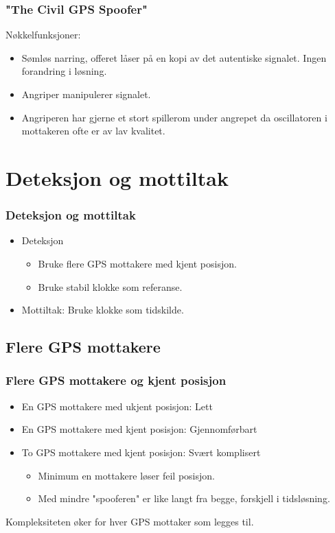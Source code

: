 \documentclass[xcolor=table]{beamer}
\begin{document}
\begin{frame}
  \frametitle{"The Civil GPS Spoofer"}
  Nøkkelfunksjoner:
  \begin{itemize}
    \item Sømløs narring, offeret låser på en kopi av det autentiske signalet. Ingen forandring i løsning.
    \item Angriper manipulerer signalet.
    \item Angriperen har gjerne et stort spillerom under angrepet da oscillatoren i mottakeren ofte er av lav kvalitet.
  \end{itemize}
\end{frame}

\section{Deteksjon og mottiltak}
\begin{frame}
\frametitle{Deteksjon og mottiltak}
  \begin{itemize}
    \item Deteksjon
    \begin{itemize}
      \item Bruke flere GPS mottakere med kjent posisjon.
      \item Bruke stabil klokke som referanse.
    \end{itemize}
    \item Mottiltak: Bruke klokke som tidskilde.
  \end{itemize}
\end{frame}

\subsection{Flere GPS mottakere}
\begin{frame} 
  \frametitle{Flere GPS mottakere og kjent posisjon}
  \begin{itemize}
    \item En GPS mottakere med ukjent posisjon: Lett
    \item En GPS mottakere med kjent posisjon: Gjennomførbart
    \item To GPS mottakere med kjent posisjon: Svært komplisert
    \begin{itemize}
      \item Minimum en mottakere løser feil posisjon.
      \item Med mindre "spooferen" er like langt fra begge, forskjell i tidsløsning.  
    \end{itemize}
  \end{itemize}
  Kompleksiteten øker for hver GPS mottaker som legges til.
\end{frame}
\end{document}
